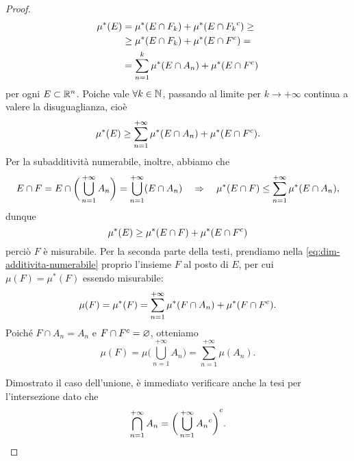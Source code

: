 \begin{proof}
\begin{equation}
		\begin{split}
			\mu^*(E)&=\mu^*(E\cap F_k)+\mu^*(E\cap{F_k}^c)\geq\\
			&\geq\mu^*(E\cap F_k)+\mu^*(E\cap{F}^c)=\\
			&=\sum_{n=1}^k\mu^*(E\cap A_n)+\mu^*(E\cap{F}^c)
		\end{split}
	\end{equation}
	per ogni $E\subset\mathbb{R}^n$.
	Poiche vale $\forall k\in\mathbb{N}$, passando al limite per $k\to+\infty$ continua a valere la disuguaglianza, cioè
	\begin{equation}
		\mu^*(E)\geq\sum_{n=1}^{+\infty}\mu^*(E\cap A_n)+\mu^*(E\cap{F}^c).
		\label{eq:dim-additivita-numerabile}
	\end{equation}
	Per la subadditività numerabile, inoltre, abbiamo che
	\begin{equation}
		E\cap F=E\cap\bigg(\bigcup_{n=1}^{+\infty}A_n\bigg)=\bigcup_{n=1}^{+\infty}(E\cap A_n)\quad\Rightarrow\quad\mu^*(E\cap F)\leq\sum_{n=1}^{+\infty}\mu^*(E\cap A_n),
	\end{equation}
	dunque
	\begin{equation}
		\mu^*(E)\geq\mu^*(E\cap F)+\mu^*(E\cap{F}^c)
	\end{equation}
	perciò $F$ è misurabile.
	Per la seconda parte della testi, prendiamo nella \eqref{eq:dim-additivita-numerabile} proprio l'insieme $F$ al posto di $E$, per cui $\mu(F)=\mu^*(F)$ essendo misurabile:
	\begin{equation}
		\mu(F)=\mu^*(F)=\sum_{n=1}^{+\infty}\mu^*(F\cap A_n)+\mu^*(F\cap{F}^c).
	\end{equation}
	Poich\'e $F\cap A_n=A_n$ e $F\cap{F}^c=\varnothing$, otteniamo
	\begin{equation}
		\mu(F)=\mu\bigg(\bigcup_{n=1}^{+\infty}A_n\bigg)=\sum_{n=1}^{+\infty}\mu(A_n).
	\end{equation}

	Dimostrato il caso dell'unione, è immediato verificare anche la tesi per l'intersezione dato che
	\begin{equation}
		\bigcap_{n=1}^{+\infty}A_n={\bigg(\bigcup_{n=1}^{+\infty}{A_n}^c\bigg)}^c.
	\end{equation}
\end{proof}

